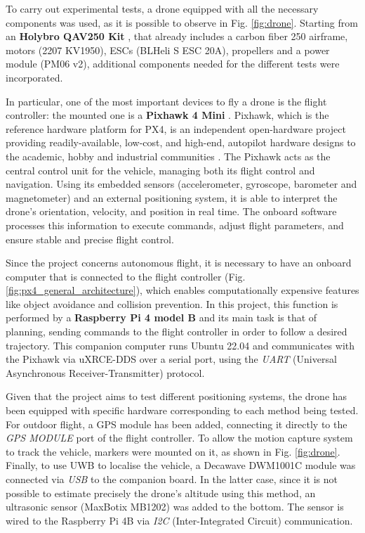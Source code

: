 \documentclass[journal]{IEEEtran}
\begin{document}
To carry out experimental tests, a drone equipped with all the necessary components was used, as it is possible to observe in Fig. \ref{fig:drone}. Starting from an \textbf{Holybro QAV250 Kit} \cite{qav250kit}, that already includes a carbon fiber 250 airframe, motors (2207 KV1950), ESCs (BLHeli S ESC 20A), propellers and a power module (PM06 v2), additional components needed for the different tests were incorporated. 

In particular, one of the most important devices to fly a drone is the flight controller: the mounted one is a \textbf{Pixhawk 4 Mini} \cite{pixhawk4mini}. Pixhawk, which is the reference hardware platform for PX4, is an independent open-hardware project providing readily-available, low-cost, and high-end, autopilot hardware designs to the academic, hobby and industrial communities \cite{pixhawk}. The Pixhawk acts as the central control unit for the vehicle, managing both its flight control and navigation. Using its embedded sensors (accelerometer, gyroscope, barometer and magnetometer) and an external positioning system, it is able to interpret the drone's orientation, velocity, and position in real time. The onboard software processes this information to execute commands, adjust flight parameters, and ensure stable and precise flight control.

Since the project concerns autonomous flight, it is necessary to have an onboard computer that is connected to the flight controller (Fig. \ref{fig:px4_general_architecture}), which enables computationally expensive features like object avoidance and collision prevention. In this project, this function is performed by a \textbf{Raspberry Pi 4 model B} and its main task is that of planning, sending commands to the flight controller in order to follow a desired trajectory. This companion computer runs Ubuntu 22.04 and communicates with the Pixhawk via uXRCE-DDS over a serial port, using the \textit{UART} (Universal Asynchronous Receiver-Transmitter) protocol. 

Given that the project aims to test different positioning systems, the drone has been equipped with specific hardware corresponding to each method being tested. For outdoor flight, a GPS module has been added, connecting it directly to the \textit{GPS MODULE} port of the flight controller. To allow the motion capture system to track the vehicle, markers were mounted on it, as shown in Fig. \ref{fig:drone}. Finally, to use UWB to localise the vehicle, a Decawave DWM1001C module was connected via \textit{USB} to the companion board. In the latter case, since it is not possible to estimate precisely the drone's altitude using this method, an ultrasonic sensor (MaxBotix MB1202) was added to the bottom. The sensor is wired to the Raspberry Pi 4B via \textit{I2C} (Inter-Integrated Circuit) communication.
\end{document}
